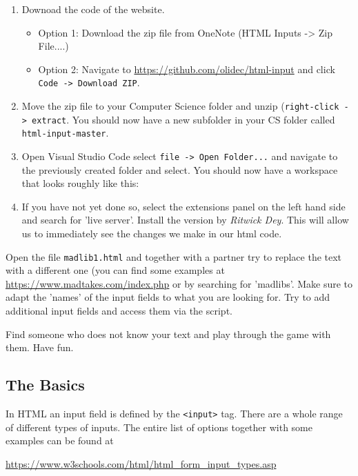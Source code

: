 \documentclass[11pt,a4paper]{report}
\begin{document}
\renewcommand{\labelenumi}{\arabic{enumi}.}
\begin{enumerate}
\item Downoad the code of the website.
\begin{itemize}
\item Option 1: Download the zip file from OneNote (HTML Inputs -> Zip File....)
\item Option 2: Navigate to \url{https://github.com/olidec/html-input} and click \verb|Code -> Download ZIP|.
\end{itemize}
\item Move the zip file to your Computer Science folder and unzip (\verb|right-click -> extract|. You should now have a new subfolder in your CS folder called \verb|html-input-master|.
\item Open Visual Studio Code select \verb|file -> Open Folder...| and navigate to the previously created folder and select. You should now have a workspace that looks roughly like this:
\item If you have not yet done so, select the extensions panel on the left hand side and search for 'live server'. Install the version by \emph{Ritwick Dey}. This will allow us to immediately see the changes we make in our html code.
\end{enumerate}

\begin{ex}
Open the file \verb|madlib1.html| and together with a partner try to replace the text with a different one (you can find some examples at \url{https://www.madtakes.com/index.php} or by searching for 'madlibs'.  Make sure to adapt the 'names' of the input fields to what you are looking for. Try to add additional input fields and access them via the script.

Find someone who does not know your text and play through the game with them. Have fun.
\end{ex}


\subsection{The Basics}

In HTML an input field is defined by the \verb|<input>| tag. There are a whole range of different types of inputs. The entire list of options together with some examples can be found at
\begin{center}
\url{https://www.w3schools.com/html/html_form_input_types.asp}
\end{center}
\end{document}
